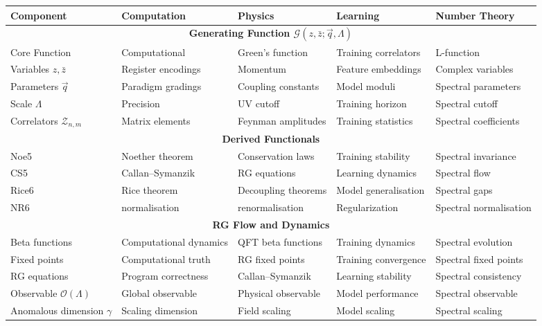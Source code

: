 \begin{table}[h]
\centering
\footnotesize
\begin{tabular}{|l|p{2cm}|p{2cm}|p{2cm}|p{2cm}|}
\hline
\textbf{Component} & \textbf{Computation} & \textbf{Physics} & \textbf{Learning} & \textbf{Number Theory} \\
\hline
\multicolumn{5}{|c|}{\textbf{Generating Function $\mathcal{G}(z,\bar{z};\vec{q},\Lambda)$}} \\
\hline
Core Function & Computational & Green's function & Training correlators & L-function \\
\hline
Variables $z,\bar{z}$ & Register encodings & Momentum & Feature embeddings & Complex variables \\
\hline
Parameters $\vec{q}$ & Paradigm gradings & Coupling constants & Model moduli & Spectral parameters \\
\hline
Scale $\Lambda$ & Precision & UV cutoff & Training horizon & Spectral cutoff \\
\hline
Correlators $\mathcal{Z}_{n,m}$ & Matrix elements & Feynman amplitudes & Training statistics & Spectral coefficients \\
\hline
\multicolumn{5}{|c|}{\textbf{Derived Functionals}} \\
\hline
Noe5 & Noether theorem & Conservation laws & Training stability & Spectral invariance \\
\hline
CS5 & Callan–Symanzik & RG equations & Learning dynamics & Spectral flow \\
\hline
Rice6 & Rice theorem & Decoupling theorems & Model generalisation & Spectral gaps \\
\hline
NR6 & normalisation & renormalisation & Regularization & Spectral normalisation \\
\hline
\multicolumn{5}{|c|}{\textbf{RG Flow and Dynamics}} \\
\hline
Beta functions & Computational dynamics & QFT beta functions & Training dynamics & Spectral evolution \\
\hline
Fixed points & Computational truth & RG fixed points & Training convergence & Spectral fixed points \\
\hline
RG equations & Program correctness & Callan–Symanzik & Learning stability & Spectral consistency \\
\hline
Observable $\mathcal{O}(\Lambda)$ & Global observable & Physical observable & Model performance & Spectral observable \\
\hline
Anomalous dimension $\gamma$ & Scaling dimension & Field scaling & Model scaling & Spectral scaling \\

\end{tabular}
\end{table}
